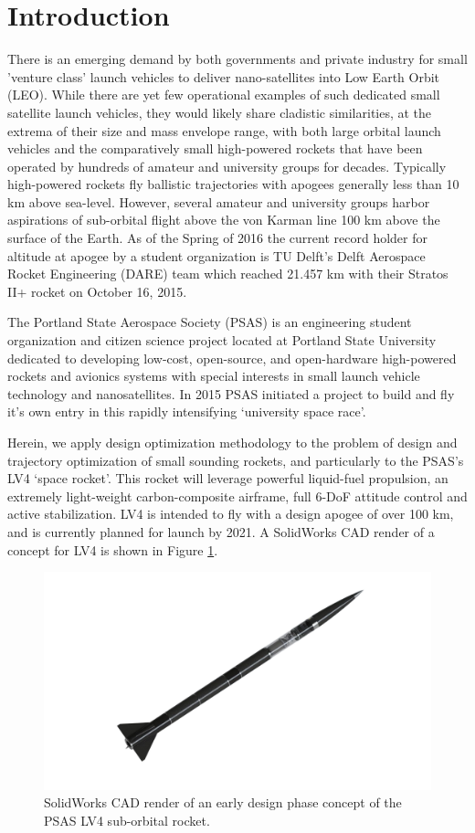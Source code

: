 \documentclass[]{aiaa-tc}%
\begin{document}
\section{Introduction}
There is an emerging demand by both governments and private industry for small 'venture class' launch vehicles to deliver nano-satellites into Low Earth Orbit (LEO). While there are yet few operational examples of such dedicated small satellite launch vehicles, they would likely share cladistic similarities, at the extrema of their size and mass envelope range, with both large orbital launch vehicles and the comparatively small high-powered rockets that have been operated by hundreds of amateur and university groups for decades. Typically high-powered rockets fly ballistic trajectories with apogees generally less than 10 km above sea-level. However, several amateur and university groups harbor aspirations of sub-orbital flight above the von Karman line 100 km above the surface of the Earth. As of the Spring of 2016 the current record holder for altitude at apogee by a student organization is TU Delft's Delft Aerospace Rocket Engineering (DARE) team which reached 21.457 km with their Stratos II+ rocket on October 16, 2015\cite{dare}.

The Portland State Aerospace Society (PSAS) is an engineering student organization and citizen science project located at Portland State University dedicated to developing low-cost, open-source, and open-hardware high-powered rockets and avionics systems with special interests in small launch vehicle technology and nanosatellites\cite{PSAS}. In 2015 PSAS initiated a project to build and fly it's own entry in this rapidly intensifying `university space race'.

Herein, we apply design optimization methodology to the problem of design and trajectory optimization of small sounding rockets, and particularly to the PSAS's LV4 `space rocket'. This rocket will leverage powerful liquid-fuel propulsion, an extremely light-weight carbon-composite airframe, full 6-DoF attitude control and active stabilization. LV4 is intended to fly with a design apogee of over 100 km, and is currently planned for launch by 2021. A SolidWorks CAD render of a concept for LV4 is shown in Figure \ref{fig:rocket}.

\begin{figure}[h!]
  \centering
  \includegraphics[width=0.9\linewidth]{Figures/LV4_render.png}
  \caption{SolidWorks CAD render of an early design phase concept of the PSAS LV4 sub-orbital rocket.}
  \label{fig:rocket}
\end{figure}
\end{document}
